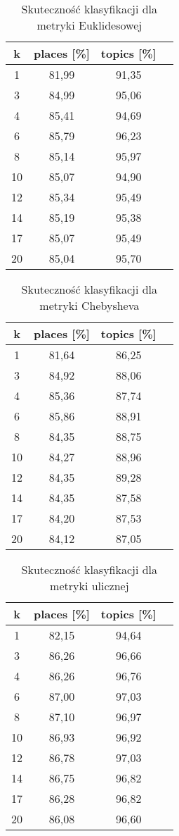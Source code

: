 \documentclass{classrep}
\begin{document}
\begin{table}[H]
	\centering
	\begin{tabular}{c c c c} 
		\hline
		\textbf{k} & \textbf{places [\%]} & \textbf{topics [\%]} \\ [0.5ex] 
		\hline
		\hline 
1	& 81,99 &	91,35 \\
3	& 84,99 &	95,06 \\
4	& 85,41 & 94,69 \\
6	& 85,79 &	96,23 \\
8	&85,14 &	95,97 \\
10	&85,07&	94,90 \\
12	&85,34&	95,49 \\
14	&85,19&	95,38 \\
17	&85,07&	95,49 \\
20	&85,04&	95,70 \\
		\hline
	\end{tabular}
	\caption{Skuteczność klasyfikacji dla metryki Euklidesowej}
\end{table}

\begin{table}[H]
	\centering
	\begin{tabular}{c c c c} 
		\hline
		\textbf{k} & \textbf{places [\%]} & \textbf{topics [\%]} \\ [0.5ex] 
		\hline
		\hline 
1	&	81,64	&	86,25	\\
3	&	84,92	&	88,06	\\
4	&	85,36	&	87,74	\\
6	&	85,86	&	88,91	\\
8	&	84,35	&	88,75	\\
10	&	84,27	&	88,96	\\
12	&	84,35	&	89,28	\\
14	&	84,35	&	87,58	\\
17	&	84,20	&	87,53	\\
20	&	84,12	&	87,05	\\
		\hline
	\end{tabular}
	\caption{Skuteczność klasyfikacji dla metryki Chebysheva}
\end{table}

\begin{table}[H]
	\centering
	\begin{tabular}{c c c c} 
		\hline
		\textbf{k} & \textbf{places [\%]} & \textbf{topics [\%]} \\ [0.5ex] 
		\hline
		\hline 
1	&	82,15	&	94,64	\\
3	&	86,26	&	96,66	\\
4	&	86,26	&	96,76	\\
6	&	87,00	&	97,03	\\
8	&	87,10	&	96,97	\\
10	&	86,93	&	96,92	\\
12	&	86,78	&	97,03	\\
14	&	86,75	&	96,82	\\
17	&	86,28	&	96,82	\\
20	&	86,08	&	96,60	\\
		\hline
	\end{tabular}
	\caption{Skuteczność klasyfikacji dla metryki ulicznej}
\end{table}
\end{document}
